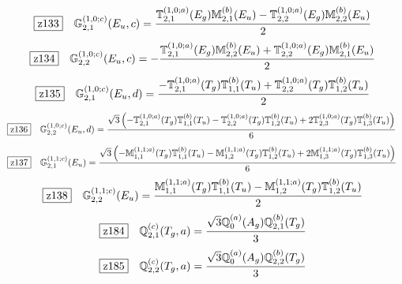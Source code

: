 \documentclass[fleqn,10pt,landscape]{jsarticle}
\begin{document}
\begin{dmath*}
\hspace*{3mm}\fbox{z133}\quad \mathbb{G}_{2,1}^{(1,0;c)}(E_{u},c)=\frac{\mathbb{T}_{2,1}^{(1,0;a)}(E_{g}) \mathbb{M}_{2,1}^{(b)}(E_{u}) - \mathbb{T}_{2,2}^{(1,0;a)}(E_{g}) \mathbb{M}_{2,2}^{(b)}(E_{u})}{2}
\end{dmath*}
\begin{dmath*}
\hspace*{3mm}\fbox{z134}\quad \mathbb{G}_{2,2}^{(1,0;c)}(E_{u},c)=- \frac{\mathbb{T}_{2,1}^{(1,0;a)}(E_{g}) \mathbb{M}_{2,2}^{(b)}(E_{u}) + \mathbb{T}_{2,2}^{(1,0;a)}(E_{g}) \mathbb{M}_{2,1}^{(b)}(E_{u})}{2}
\end{dmath*}
\begin{dmath*}
\hspace*{3mm}\fbox{z135}\quad \mathbb{G}_{2,1}^{(1,0;c)}(E_{u},d)=\frac{- \mathbb{T}_{2,1}^{(1,0;a)}(T_{g}) \mathbb{T}_{1,1}^{(b)}(T_{u}) + \mathbb{T}_{2,2}^{(1,0;a)}(T_{g}) \mathbb{T}_{1,2}^{(b)}(T_{u})}{2}
\end{dmath*}
\begin{dmath*}
\hspace*{3mm}\fbox{z136}\quad \mathbb{G}_{2,2}^{(1,0;c)}(E_{u},d)=\frac{\sqrt{3} \left(- \mathbb{T}_{2,1}^{(1,0;a)}(T_{g}) \mathbb{T}_{1,1}^{(b)}(T_{u}) - \mathbb{T}_{2,2}^{(1,0;a)}(T_{g}) \mathbb{T}_{1,2}^{(b)}(T_{u}) + 2 \mathbb{T}_{2,3}^{(1,0;a)}(T_{g}) \mathbb{T}_{1,3}^{(b)}(T_{u})\right)}{6}
\end{dmath*}
\begin{dmath*}
\hspace*{3mm}\fbox{z137}\quad \mathbb{G}_{2,1}^{(1,1;c)}(E_{u})=\frac{\sqrt{3} \left(- \mathbb{M}_{1,1}^{(1,1;a)}(T_{g}) \mathbb{T}_{1,1}^{(b)}(T_{u}) - \mathbb{M}_{1,2}^{(1,1;a)}(T_{g}) \mathbb{T}_{1,2}^{(b)}(T_{u}) + 2 \mathbb{M}_{1,3}^{(1,1;a)}(T_{g}) \mathbb{T}_{1,3}^{(b)}(T_{u})\right)}{6}
\end{dmath*}
\begin{dmath*}
\hspace*{3mm}\fbox{z138}\quad \mathbb{G}_{2,2}^{(1,1;c)}(E_{u})=\frac{\mathbb{M}_{1,1}^{(1,1;a)}(T_{g}) \mathbb{T}_{1,1}^{(b)}(T_{u}) - \mathbb{M}_{1,2}^{(1,1;a)}(T_{g}) \mathbb{T}_{1,2}^{(b)}(T_{u})}{2}
\end{dmath*}
\begin{dmath*}
\hspace*{3mm}\fbox{z184}\quad \mathbb{Q}_{2,1}^{(c)}(T_{g},a)=\frac{\sqrt{3} \mathbb{Q}_{0}^{(a)}(A_{g}) \mathbb{Q}_{2,1}^{(b)}(T_{g})}{3}
\end{dmath*}
\begin{dmath*}
\hspace*{3mm}\fbox{z185}\quad \mathbb{Q}_{2,2}^{(c)}(T_{g},a)=\frac{\sqrt{3} \mathbb{Q}_{0}^{(a)}(A_{g}) \mathbb{Q}_{2,2}^{(b)}(T_{g})}{3}
\end{dmath*}
\end{document}
